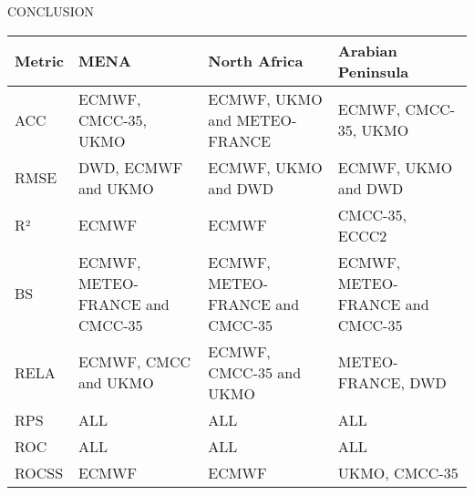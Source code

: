 \begin{frame}{CONCLUSION}
\begin{table}[h!]
\centering
\begin{tabular}{|>{\raggedright\arraybackslash}m{1cm}|>{\raggedright\arraybackslash}m{3cm}|>{\raggedright\arraybackslash}m{3cm}|>{\raggedright\arraybackslash}m{3cm}|}
\hline
\textbf{Metric} & \textbf{MENA} & \textbf{North Africa} & \textbf{Arabian Peninsula} \\ \hline
ACC & ECMWF, CMCC-35, UKMO & ECMWF, UKMO and METEO-FRANCE & ECMWF, CMCC-35, UKMO \\ \hline
RMSE & DWD, ECMWF and UKMO & ECMWF, UKMO and DWD & ECMWF, UKMO and DWD \\ \hline
R² & ECMWF & ECMWF & CMCC-35, ECCC2 \\ \hline
BS & ECMWF, METEO-FRANCE and CMCC-35 & ECMWF, METEO-FRANCE and CMCC-35 & ECMWF, METEO-FRANCE and CMCC-35 \\ \hline
RELA & ECMWF, CMCC and UKMO & ECMWF, CMCC-35 and UKMO & METEO-FRANCE, DWD \\ \hline
RPS & ALL  & ALL  & ALL  \\ \hline
ROC & ALL & ALL & ALL \\ \hline
ROCSS & ECMWF & ECMWF & UKMO, CMCC-35 \\ \hline

\end{tabular}
\end{table}
\end{frame}
